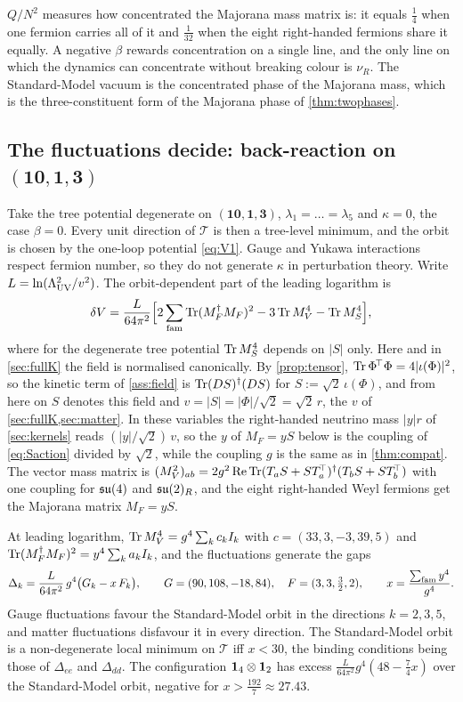 $Q/N^2$ measures how concentrated the Majorana mass matrix is: it equals $\tfrac14$ when one fermion carries all of it and $\tfrac1{32}$ when the eight
right-handed fermions share it equally. A negative $\beta$ rewards concentration on a single line, and the only line on which the dynamics can concentrate
without breaking colour is $\nu_R$. The Standard-Model vacuum is the concentrated phase of the Majorana mass, which is the three-constituent form of
the Majorana phase of \cref{thm:twophases}.

\subsection{The fluctuations decide: back-reaction on \texorpdfstring{$(\mathbf{10},\mathbf1,\mathbf3)$}{(10,1,3)}}

Take the tree potential degenerate on $(\mathbf{10},\mathbf1,\mathbf3)$, $\lambda_1=\dots=\lambda_5$ and $\kappa=0$, the case $\beta=0$. Every unit direction of $\mathcal T$ is then a
tree-level minimum, and the orbit is chosen by the one-loop potential \eqref{eq:V1}. Gauge and Yukawa interactions respect fermion number, so they do not
generate $\kappa$ in perturbation theory. Write $L=\ln(\Lambda_{\rm UV}^2/v^2)$. The orbit-dependent part of the leading logarithm is
\[
\delta V=\frac L{64\pi^2}\Bigl[2\sum_{\rm fam}\operatorname{Tr}(M_F^\dagger M_F)^2-3\operatorname{Tr} M_V^4-\operatorname{Tr} M_S^4\Bigr],
\]
where for the degenerate tree potential $\operatorname{Tr} M_S^4$ depends on $|S|$ only. Here and in \cref{sec:fullK} the field is normalised canonically. By
\cref{prop:tensor}, $\operatorname{Tr}\Phi^{\!\top}\Phi=4|\iota(\Phi)|^2$, so the kinetic term of \cref{ass:field} is $\operatorname{Tr}(DS)^\dagger(DS)$ for $S:=\sqrt2\,\iota(\Phi)$, and from
here on $S$ denotes this field and $v=|S|=|\Phi|/\sqrt2=\sqrt2\,r$, the $v$ of \cref{sec:fullK,sec:matter}. In these variables the right-handed neutrino mass
$|y|r$ of \cref{sec:kernels} reads $(|y|/\sqrt2)\,v$, so the $y$ of $M_F=yS$ below is the coupling of \eqref{eq:Saction} divided by $\sqrt2$, while the
coupling $g$ is the same as in \cref{thm:compat}. The vector mass matrix is $(M_V^2)_{ab}=2g^2\operatorname{Re}\operatorname{Tr}(T_aS+ST_a^{\!\top})^\dagger(T_bS+ST_b^{\!\top})$
with one coupling for $\mathfrak{su}(4)$ and $\mathfrak{su}(2)_R$, and the eight right-handed Weyl fermions get the Majorana matrix $M_F=yS$.

\begin{theorem}
\label{thm:oneloop1013}
At leading logarithm, $\operatorname{Tr} M_V^4=g^4\sum_kc_kI_k$ with $c=(33,3,-3,39,5)$ and $\operatorname{Tr}(M_F^\dagger M_F)^2=y^4\sum_ka_kI_k$, and the fluctuations generate the gaps
\[
\Delta_k=\frac L{64\pi^2}\,g^4\bigl(G_k-x\,F_k\bigr),\qquad G=(90,108,-18,84),\quad F=(3,3,\tfrac32,2),\qquad x=\frac{\sum_{\rm fam}y^4}{g^4}.
\]
Gauge fluctuations favour the Standard-Model orbit in the directions $k=2,3,5$, and matter fluctuations disfavour it in every direction. The Standard-Model
orbit is a non-degenerate local minimum on $\mathcal T$ iff $x<30$, the binding conditions being those of $\Delta_{ee}$ and $\Delta_{dd}$. The configuration $\mathbf 1_4\otimes\mathbf 1_2$
has excess $\tfrac L{64\pi^2}g^4(48-\tfrac74x)$ over the Standard-Model orbit, negative for $x>\tfrac{192}7\approx27.43$.
\end{theorem}

